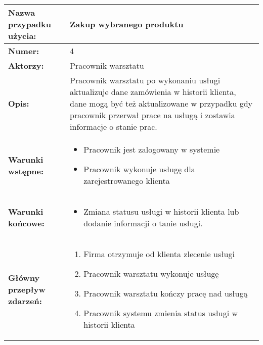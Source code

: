 \documentclass[a4paper,20pt]{article}
\begin{document}
\begin{center}
\begin{tabularx}{\textwidth}[t]{XX}

\arrayrulecolor{black}\hline
\textbf{Nazwa przypadku użycia:} & \textbf{Zakup wybranego produktu} \\
\hline

\quad \textbf{Numer:} & 
\begin{minipage}[t]{\linewidth}%
4
\end{minipage}\\


\quad \textbf{Aktorzy:} & 
\begin{minipage}[t]{\linewidth}%
Pracownik warsztatu
\end{minipage}\\


\quad \textbf{Opis:} & 
\begin{minipage}[t]{\linewidth}%
Pracownik warsztatu po wykonaniu usługi aktualizuje dane zamówienia w historii klienta, dane mogą być też aktualizowane w przypadku gdy pracownik przerwał prace na usługą i zostawia informacje o stanie prac. 
\end{minipage}\\


\quad \textbf{Warunki wstępne:} & 
\begin{minipage}[t]{\linewidth}%
\begin{itemize}
\item Pracownik jest zalogowany w systemie
\item Pracownik wykonuje usługę dla zarejestrowanego klienta
\end{itemize}
\end{minipage}\\


\quad \textbf{Warunki końcowe:} & 
\begin{minipage}[t]{\linewidth}%
\begin{itemize}
\item Zmiana statusu usługi w historii klienta lub dodanie informacji o tanie usługi.
\end{itemize}
\end{minipage}\\


\quad \textbf{Główny przepływ zdarzeń:} & 
\begin{minipage}[t]{\linewidth}%
\begin{enumerate}
\item Firma otrzymuje od klienta zlecenie usługi
\item Pracownik warsztatu wykonuje usługę 
\item Pracownik warsztatu kończy pracę nad usługą
\item Pracownik systemu zmienia status usługi w historii klienta
\end{enumerate}
\end{minipage}\\



\end{tabularx}
\end{center}
\end{document}
